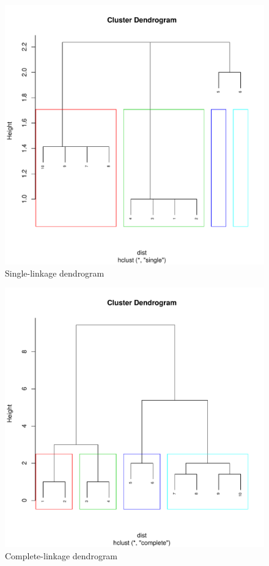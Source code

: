 \documentclass[letterpaper,11pt]{article}
\begin{document}
\begin{figure}[h]
\centering
\includegraphics[scale=0.5]{single-dendro.pdf}
\caption{Single-linkage dendrogram}
\label{fig:6}
\end{figure}

\begin{figure}[h]
\centering
\includegraphics[scale=0.5]{complete-dendro.pdf}
\caption{Complete-linkage dendrogram}
\label{fig:7}
\end{figure}
\end{document}
